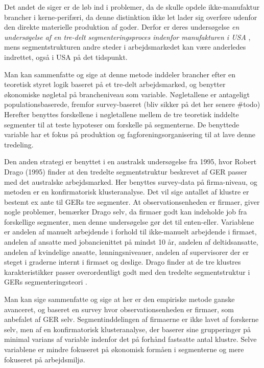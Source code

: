 Det andet de siger er de løb ind i problemer, da de skulle opdele ikke-manufaktur brancher i kerne-perifæri, da denne distinktion ikke let lader sig overføre udenfor den direkte materielle produktion af goder. Derfor er deres undersøgelse \emph{en undersøgelse af en tre-delt segmenteringsproces indenfor manufakturen i USA} \parencite[199]{Gordon1982}, mens segmentstrukturen andre steder i arbejdsmarkedet kan være anderledes indrettet, også i USA på det tidspunkt.

Man kan sammenfatte og sige at denne metode inddeler brancher efter en teoretisk styret logik baseret på et tre-delt arbejdsmarked, og benytter økonomiske nøgletal på brancheniveau som variable. Nøgletallene er antageligt populationsbaserede, fremfor survey-baseret (bliv sikker på det her senere \#todo) Herefter benyttes forskellene i nøgletallene mellem de tre teoretisk inddelte segmenter til at teste hypoteser om forskelle på segmenterne. De benyttede variable har et fokus på produktion og fagforeningsorganisering til at lave denne tredeling.  

Den anden strategi er benyttet i en australsk undersøgelse fra 1995, hvor Robert Drago (1995) finder at den tredelte segmentstruktur beskrevet af GER passer med det australske arbejdsmarked. Her benyttes survey-data på firma-niveau, og metoden er en  konfirmatorisk klusteranalyse. Det vil sige antallet af klustre er bestemt ex ante til GERs tre segmenter. At observationsenheden er firmaer, giver nogle problemer, bemærker Drago selv, da firmaer godt kan indeholde job fra forskellige segmenter, men denne undersøgelse gør det til enten-eller. Variablene er andelen af manuelt arbejdende i forhold til ikke-manuelt arbejdende i firmaet, andelen af ansatte med jobancienittet på mindst 10 år, andelen af deltidsansatte, andelen af kvindelige ansatte, lønningsniveauer, andelen af supervisorer der er steget i graderne internt i firmaet og deslige. Drago finder at de tre klustres karakteristikker passer overordentligt godt med den tredelte segmentstruktur i GERs segmenteringsteori \parencite[59]{Drago1995}. 

Man kan sige sammenfatte og sige at her er den empiriske metode ganske avanceret, og baseret en survey hvor observationsenheden er firmaer, som anbefalet af GER selv. Segmentinddelingen af firmaerne er ikke lavet af forskerne selv, men af en konfirmatorisk klusteranalyse, der baserer sine grupperinger på minimal varians af variable indenfor det på forhånd fastsatte antal klustre. Selve variablene er mindre fokuseret på økonomisk formåen i segmenterne og mere fokuseret på arbejdsmiljø. 


